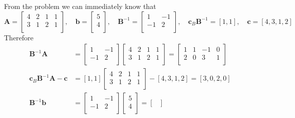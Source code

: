 \documentclass[a4paper]{article}
\begin{document}
\begin{enumerate}
\begin{enumerate}
\begin{solution}
		From the problem we can immediately know that
		\begin{equation*}
		\mathbf{A}=\begin{bmatrix}
		4&2&1&1\\
		3&1&2&1\\
		\end{bmatrix},\quad
		\mathbf{b}=\begin{bmatrix}
		5\\
		4\\
		\end{bmatrix},\quad
		\mathbf{B}^{-1}=\begin{bmatrix}
		1&-1\\
		-1&2\\
		\end{bmatrix},\quad
		\mathbf{c}_B\mathbf{B}^{-1}
		=[1,1],\quad
		\mathbf{c}=[4,3,1,2]
		\end{equation*}
		Therefore
		\begin{equation*}
		\begin{aligned}
		\mathbf{B}^{-1}\mathbf{A}&=\begin{bmatrix}
		1&-1\\
		-1&2\\
		\end{bmatrix}\begin{bmatrix}
		4&2&1&1\\
		3&1&2&1\\
		\end{bmatrix}
		=\begin{bmatrix}
		1&1&-1&0\\
		2&0&3&1\\
		\end{bmatrix}\\
		\mathbf{c}_B\mathbf{B}^{-1}\mathbf{A}-\mathbf{c}&=
		[1,1]\begin{bmatrix}
		4&2&1&1\\
		3&1&2&1\\
		\end{bmatrix}-[4,3,1,2]=[3,0,2,0]\\
			\mathbf{B}^{-1}\mathbf{b}&=\begin{bmatrix}
		1&-1\\
		-1&2\\
		\end{bmatrix}\begin{bmatrix}
		5\\
		4\\
		\end{bmatrix}
		=\begin{bmatrix}

\end{bmatrix}
\end{aligned}
\end{equation*}
\end{solution}
\end{enumerate}
\end{enumerate}
\end{document}
